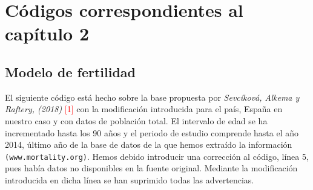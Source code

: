 \section{C\'odigos correspondientes al cap\'itulo 2}

\subsection{Modelo de fertilidad}

El siguiente c\'odigo  est\'a hecho sobre la base propuesta por \textit{Sevcíková, Alkema y Raftery, (2018)} \textcolor{red}{[1]} con la modificaci\'on introducida para el pa\'is, Espa\~na en nuestro caso y con datos de poblaci\'on total. El intervalo de edad se ha incrementado hasta los 90 a\~nos  y el periodo de estudio comprende hasta el a\~no 2014, \'ultimo a\~no de la base de datos de la que hemos extra\'ido la informaci\'on \texttt{(www.mortality.org)}. Hemos debido introducir una correcci\'on al c\'odigo, l\'inea 5, pues hab\'ia datos no disponibles en la fuente original. Mediante la modificaci\'on introducida en dicha l\'inea se han suprimido todas las advertencias.

